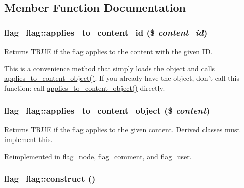 \subsection{Member Function Documentation}
\hypertarget{classflag__flag_a38afcc59d7d1ef028215521c6fcdc22}{
\subsubsection[{applies\_\-to\_\-content\_\-id}]{\setlength{\rightskip}{0pt plus 5cm}flag\_\-flag::applies\_\-to\_\-content\_\-id (\$ {\em content\_\-id})}}
\label{classflag__flag_a38afcc59d7d1ef028215521c6fcdc22}


Returns TRUE if the flag applies to the content with the given ID.

This is a convenience method that simply loads the object and calls \hyperlink{classflag__flag_55c4da8291aed979309f25ce09953092}{applies\_\-to\_\-content\_\-object()}. If you already have the object, don't call this function: call \hyperlink{classflag__flag_55c4da8291aed979309f25ce09953092}{applies\_\-to\_\-content\_\-object()} directly. \hypertarget{classflag__flag_55c4da8291aed979309f25ce09953092}{
\subsubsection[{applies\_\-to\_\-content\_\-object}]{\setlength{\rightskip}{0pt plus 5cm}flag\_\-flag::applies\_\-to\_\-content\_\-object (\$ {\em content})}}
\label{classflag__flag_55c4da8291aed979309f25ce09953092}


Returns TRUE if the flag applies to the given content. Derived classes must implement this.

Reimplemented in \hyperlink{classflag__node_d2b546768e89ad2622ba698f22146df8}{flag\_\-node}, \hyperlink{classflag__comment_4941d3bede8159f596a40c6f8aea7b3b}{flag\_\-comment}, and \hyperlink{classflag__user_1166b6c58dbd8074dd5187f3c5b84c8b}{flag\_\-user}.\hypertarget{classflag__flag_e3ae686e7c5f00620609bb1761c1e00b}{
\subsubsection[{construct}]{\setlength{\rightskip}{0pt plus 5cm}flag\_\-flag::construct ()}}
\label{classflag__flag_e3ae686e7c5f00620609bb1761c1e00b}


